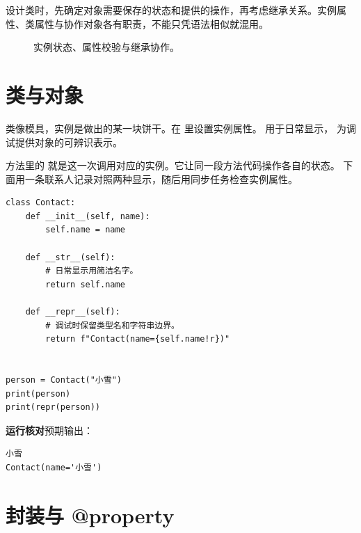 \documentclass[UTF8,a4paper,oneside,openany,fontset=none,11pt]{ctexbook}
\newcommand{\code}[1]{\texttt{\detokenize{#1}}}
\begin{document}
设计类时，先确定对象需要保存的状态和提供的操作，再考虑继承关系。实例属性、类属性与协作对象各有职责，不能只凭语法相似就混用。


\begin{figure}[htbp]
  \centering
  \caption*{实例状态、属性校验与继承协作。}
\end{figure}


\section{类与对象}

类像模具，实例是做出的某一块饼干。在 \code{__init__} 里设置实例属性。
\code{__str__} 用于日常显示，\code{__repr__} 为调试提供对象的可辨识表示。

方法里的 \code{self} 就是这一次调用对应的实例。它让同一段方法代码操作各自的状态。
下面用一条联系人记录对照两种显示，随后用同步任务检查实例属性。


\begin{lstlisting}[title={\code{contact_repr.py}}]
class Contact:
    def __init__(self, name):
        self.name = name

    def __str__(self):
        # 日常显示用简洁名字。
        return self.name

    def __repr__(self):
        # 调试时保留类型名和字符串边界。
        return f"Contact(name={self.name!r})"


person = Contact("小雪")
print(person)
print(repr(person))
\end{lstlisting}


\textbf{运行核对}\enspace 预期输出：
\begin{lstlisting}[language={},numbers=none]
小雪
Contact(name='小雪')
\end{lstlisting}

\par


\section{封装与 @property}
\end{document}
